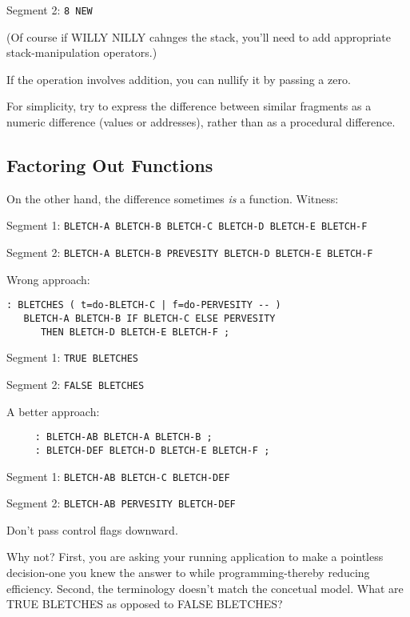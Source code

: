 Segment 2:    \texttt{8 NEW}

\bigskip

\noindent 
(Of course if WILLY NILLY cahnges the stack, you'll need to add appropriate stack-manipulation operators.)

If the operation involves addition, you can nullify it by passing a zero.

\begin{tip}
For simplicity, try to express the difference between similar fragments as a numeric difference (values or addresses), rather than as a procedural difference.
\end{tip}


\subsection{{Factoring Out Functions}}

On the other hand, the difference sometimes \emph{is} a function. Witness:

\bigskip


Segment 1:	\texttt{BLETCH-A BLETCH-B BLETCH-C BLETCH-D BLETCH-E BLETCH-F}

Segment 2:	\texttt{BLETCH-A BLETCH-B PREVESITY BLETCH-D BLETCH-E BLETCH-F}

\bigskip

\noindent
Wrong approach:

\begin{verbatim}
: BLETCHES ( t=do-BLETCH-C | f=do-PERVESITY -- ) 
   BLETCH-A BLETCH-B IF BLETCH-C ELSE PERVESITY 
      THEN BLETCH-D BLETCH-E BLETCH-F ;
\end{verbatim}

\noindent 
Segment 1:	\texttt{TRUE BLETCHES}

\noindent
Segment 2:	\texttt{FALSE BLETCHES}

\bigskip

\noindent 
A better approach:

\begin{verbatim}
     : BLETCH-AB BLETCH-A BLETCH-B ;
     : BLETCH-DEF BLETCH-D BLETCH-E BLETCH-F ;
\end{verbatim}

\indent Segment 1:	\texttt{BLETCH-AB BLETCH-C BLETCH-DEF}

\indent Segment 2:	\texttt{BLETCH-AB PERVESITY BLETCH-DEF}

\begin{tip}
Don't pass control flags downward.
\end{tip}
Why not? First, you are asking your running application to make a pointless decision-one you knew the answer to while programming-thereby reducing efficiency. Second, the terminology doesn't match the concetual model. What are TRUE BLETCHES as opposed to FALSE BLETCHES?

